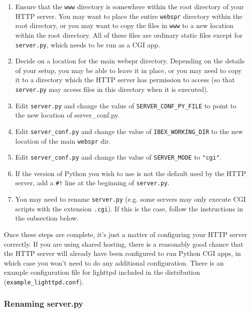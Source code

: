 \documentclass[
]{article}
\begin{document}
\begin{enumerate}
\item
  Ensure that the \texttt{www} directory is somewhere within the root
  directory of your HTTP server. You may want to place the entire
  \texttt{webspr} directory within the root directory, or you may want
  to copy the files in \texttt{www} to a new location within the root
  directory. All of these files are ordinary static files except for
  \texttt{server.py}, which needs to be run as a CGI app.
\item
  Decide on a location for the main webspr directory. Depending on the
  details of your setup, you may be able to leave it in place, or you
  may need to copy it to a directory which the HTTP server has
  permission to access (so that \texttt{server.py} may access files in
  this directory when it is executed).
\item
  Edit \texttt{server.py} and change the value of
  \texttt{SERVER\_CONF\_PY\_FILE} to point to the new location of
  server\_conf.py.
\item
  Edit \texttt{server\_conf.py} and change the value of
  \texttt{IBEX\_WORKING\_DIR} to the new location of the main
  \texttt{webspr} dir.
\item
  Edit \texttt{server\_conf.py} and change the value of
  \texttt{SERVER\_MODE} to \texttt{"cgi"}.
\item
  If the version of Python you wish to use is not the default used by
  the HTTP server, add a \texttt{\#!} line at the beginning of
  \texttt{server.py}.
\item
  You may need to rename \texttt{server.py} (e.g. some servers may only
  execute CGI scripts with the extension \texttt{.cgi}). If this is the
  case, follow the instructions in the subsection below.
\end{enumerate}

Once these steps are complete, it's just a matter of configuring your
HTTP server correctly. If you are using shared hosting, there is a
reasonably good chance that the HTTP server will already have been
configured to run Python CGI apps, in which case you won't need to do
any additional configuration. There is an example configuration file for
lighttpd included in the distribution (\texttt{example\_lighttpd.conf}).

\hypertarget{renaming-serverpy}{%
\subsubsection{Renaming server.py}\label{renaming-serverpy}}
\end{document}
